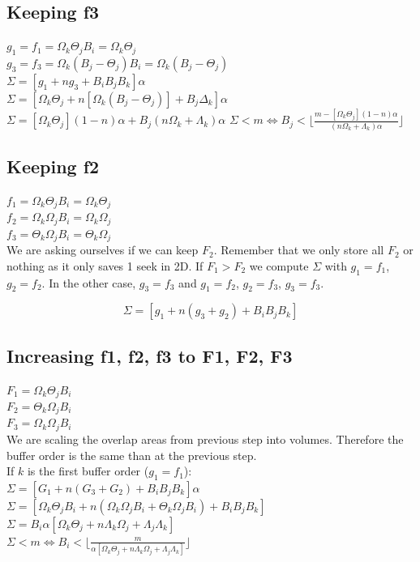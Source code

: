 \documentclass[conference]{IEEEtran}
\begin{document}
  \subsection{Keeping f3}
  \noindent $g_1 = f_1 = \Omega_k\Theta_jB_i = \Omega_k\Theta_j $ \\
  $g_3 = f_3 = \Omega_k (B_j - \Theta_j)B_i = \Omega_k(B_j - \Theta_j)$ \\
  $\Sigma = [g_1 + ng_3 + B_iB_jB_k]\alpha$ \\
  $\Sigma = [\Omega_k\Theta_j + n[\Omega_k(B_j -\Theta_j)] + B_j\Delta_k]\alpha$
  $\Sigma = [\Omega_k \Theta_j](1-n)\alpha + B_j(n\Omega_k + \Lambda_k)\alpha$
  $\Sigma < m \Leftrightarrow B_j < \lfloor \frac{m - [\Omega_k \Theta_j](1-n)\alpha}{(n\Omega_k + \Lambda_k)\alpha} \rfloor$

  \subsection{Keeping f2}
  \noindent $f_1 = \Omega_k \Theta_j B_i = \Omega_k \Theta_j $ \\
  $f_2 = \Omega_k \Omega_j B_i = \Omega_k \Omega_j $ \\
  $f_3 = \Theta_k \Omega_j B_i = \Theta_k \Omega_j $ \\

  We are asking ourselves if we can keep $F_2$.
  Remember that we only store all $F_2$ or nothing as it only saves 1 seek in 2D.
  If $F_1 > F_2$ we compute $\Sigma$ with $g_1 = f_1$, $g_2 = f_2$.
  In the other case, $g_3 = f_3$ and $g_1 = f_2$, $g_2 = f_3$, $g_3 = f_3$.

  $$\Sigma = [g_1 + n(g_3 + g_2) + B_iB_jB_k]$$

  \subsection{Increasing f1, f2, f3 to F1, F2, F3}
  \noindent $F_1 = \Omega_k \Theta_j B_i$ \\
  $F_2 = \Theta_k \Omega_j B_i$ \\
  $F_3 = \Omega_k \Omega_j B_i$ \\

  We are scaling the overlap areas from previous step into volumes.
  Therefore the buffer order is the same than at the previous step. \\

  If $k$ is the first buffer order ($g_1 =f_1$): \\
  $\Sigma = [G_1 + n(G_3 + G_2) + B_iB_jB_k]\alpha$ \\
  $\Sigma = [\Omega_k \Theta_j B_i + n(\Omega_k \Omega_j B_i + \Theta_k \Omega_j B_i) + B_iB_jB_k]$ \\
  $\Sigma = B_i\alpha[\Omega_k \Theta_j + n \Lambda_k \Omega_j + \Lambda_j \Lambda_k]$ \\
  $\Sigma < m \Leftrightarrow B_i < \lfloor \frac{m}{\alpha[\Omega_k \Theta_j + n \Lambda_k \Omega_j + \Lambda_j \Lambda_k]} \rfloor$ \\
\end{document}
